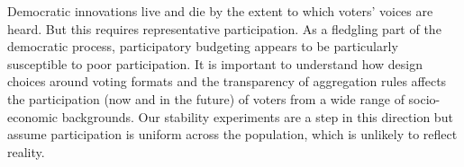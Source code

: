 \documentclass[mnsc,blindrev]{informs3_freeuse} %
\newcommand{\kibitz}[2]{\ifnum\Comments=1{\color{#1}{#2}}\fi}
\newcommand{\gb}[1]{\kibitz{red}{[GB:#1]}}
\begin{document}
Democratic innovations live and die by the extent to which voters' voices are heard. But this requires representative participation. 
As a fledgling part of the democratic process, participatory budgeting appears to be particularly susceptible to poor participation. It is important to understand how   design choices around voting formats and the transparency of aggregation rules affects the participation (now and in the future) of voters from a wide range of socio-economic backgrounds. Our stability experiments are a step in this direction but assume participation is uniform across the population, which is unlikely to reflect reality. 

\gb{Roy: there are several issues in the bibliography. Inconsistent abbreviation of author names. missing capital letters (stewart et al, Su), inconsistent capitalisation of paper titles and journal names. etc.}


\end{document}
